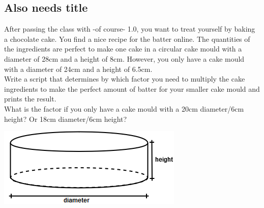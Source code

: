 \documentclass{article}
\begin{document}
\subsection{Also needs title}
After passing the class with -of course- 1.0, you want to treat yourself by baking
a chocolate cake. You find a nice recipe for the batter online. The quantities of
the ingredients are perfect to make one cake in a circular cake mould with a diameter
of 28cm and a height of 8cm. However, you only have a cake mould with a diameter of 24cm and a height of 6.5cm.\\
Write a script that determines by which factor you need to multiply the cake ingredients to
make the perfect amount of batter for your smaller cake mould and prints the result.\\What is the factor if you only
have a cake mould with a 20cm diameter/6cm height? Or 18cm diameter/6cm height?\\

\begin{center}
\includegraphics[scale=0.6]{Ex_2_Cake}
\end{center}
\end{document}
